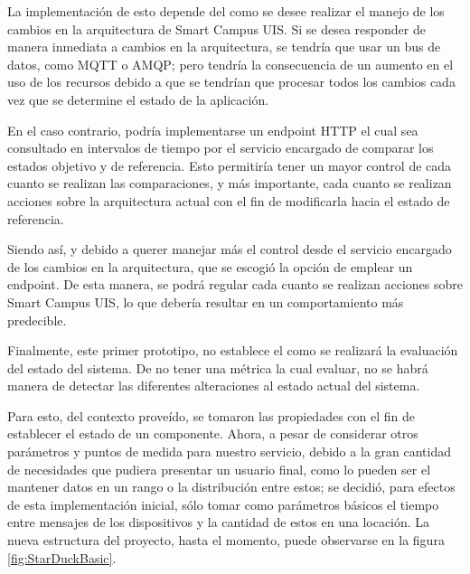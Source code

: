 La implementación de esto depende del como se desee realizar el manejo de los cambios en la arquitectura de Smart Campus UIS. Si se desea responder de manera inmediata a cambios en la arquitectura, se tendría que usar un bus de datos, como MQTT o AMQP; pero tendría la consecuencia de un aumento en el uso de los recursos debido a que se tendrían que procesar todos los cambios cada vez que se determine el estado de la aplicación. 

En el caso contrario, podría implementarse un endpoint HTTP el cual sea consultado en intervalos de tiempo por el servicio encargado de comparar los estados objetivo y de referencia. Esto permitiría tener un mayor control de cada cuanto se realizan las comparaciones, y más importante, cada cuanto se realizan acciones sobre la arquitectura actual con el fin de modificarla hacia el estado de referencia.

Siendo así, y debido a querer manejar más el control desde el servicio encargado de los cambios en la arquitectura, que se escogió la opción de emplear un endpoint. De esta manera, se podrá regular cada cuanto se realizan acciones sobre Smart Campus UIS, lo que debería resultar en un comportamiento más predecible.

Finalmente, este primer prototipo, no establece el como se realizará la evaluación del estado del sistema. De no tener una métrica la cual evaluar, no se habrá manera de detectar las diferentes alteraciones al estado actual del sistema.

Para esto, del contexto proveído, se tomaron las propiedades con el fin de establecer el estado de un componente. Ahora, a pesar de considerar otros parámetros y puntos de medida para nuestro servicio, debido a la gran cantidad de necesidades que pudiera presentar un usuario final, como lo pueden ser el mantener datos en un rango o la distribución entre estos; se decidió, para efectos de esta implementación inicial, sólo tomar como parámetros básicos el tiempo entre mensajes de los dispositivos y la cantidad de estos en una locación. La nueva estructura del proyecto, hasta el momento, puede observarse en la figura \ref{fig:StarDuckBasic}.
 

